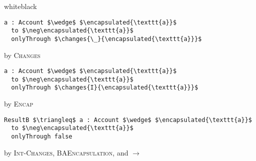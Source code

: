 \documentclass[acmsmall,review,anonymous]{acmart}\settopmatter{printfolios=true,printccs=false,printacmref=false}
\begin{document}
\begin{minipage}{\linewidth}
\begin{proofBox}{white}{black}
\footnotesize
\begin{minipage}{0.75\textwidth}
\begin{lstlisting}[language = Chainmail, mathescape=true, frame=single]
a : Account $\wedge$ $\encapsulated{\texttt{a}}$ 
  to $\neg\encapsulated{\texttt{a}}$
  onlyThrough $\changes{\_}{\encapsulated{\texttt{a}}}$
\end{lstlisting}
\end{minipage}
\begin{minipage}{0.24\textwidth}
\scriptsize
\hfill by \textsc{Changes}
\end{minipage}
\begin{minipage}{0.75\textwidth}
\begin{lstlisting}[language = Chainmail, mathescape=true]
a : Account $\wedge$ $\encapsulated{\texttt{a}}$ 
  to $\neg\encapsulated{\texttt{a}}$
  onlyThrough $\changes{I}{\encapsulated{\texttt{a}}}$
\end{lstlisting}
\end{minipage}
\begin{minipage}{0.24\textwidth}
\scriptsize
\hfill by \textsc{Encap}
\end{minipage}
\begin{minipage}{0.75\textwidth}
\begin{lstlisting}[language = Chainmail, mathescape=true, frame=none]
ResultB $\triangleq$ a : Account $\wedge$ $\encapsulated{\texttt{a}}$ 
  to $\neg\encapsulated{\texttt{a}}$ 
  onlyThrough false
\end{lstlisting}
\end{minipage}
\begin{minipage}{0.24\textwidth}
\scriptsize
\hfill by \textsc{Int-Changes}, \textsc{BAEncapsulation}, and $\longrightarrow$
\end{minipage}
\end{proofBox}


\end{minipage}
\end{document}
